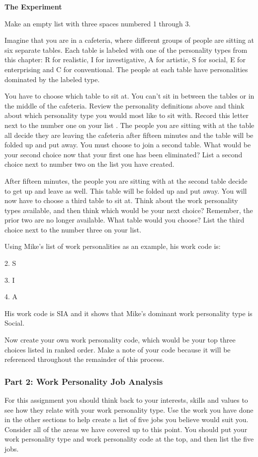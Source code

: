\textbf{The Experiment}

Make an empty list with three spaces numbered 1 through 3.

Imagine that you are in a cafeteria, where different groups of people are sitting at six separate tables. Each table is labeled with one of the personality types from this chapter: R for realistic, I for investigative, A for artistic, S for social, E for enterprising and C for conventional. The people at each table have personalities dominated by the labeled type.

You have to choose which table to sit at. You can't sit in between the tables or in the middle of the cafeteria. Review the personality definitions above and think about which personality type you would most like to sit with. Record this letter next to the number one on your list
.
The people you are sitting with at the table all decide they are leaving the cafeteria after fifteen minutes and the table will be folded up and put away. You must choose to join a second table. What would be your second choice now that your first one has been eliminated? List a second choice next to number two on the list you have created.

After fifteen minutes, the people you are sitting with at the second table decide to get up and leave as well. This table will be folded up and put away. You will now have to choose a third table to sit at. Think about the work personality types available, and then think which would be your next choice? Remember, the prior two are no longer available. What table would you choose? List the third choice next to the number three on your list.

Using Mike's list of work personalities as an example, his work code is:

2. S

3. I

4. A

His work code is SIA and it shows that Mike's dominant work personality type is Social.

Now create your own work personality code, which would be your top three choices listed in ranked order. Make a note of your code because it will be referenced throughout the remainder of this process.
\subsubsection*{Part 2: Work Personality Job Analysis}
For this assignment you should think back to your interests, skills and values to see how they relate with your work personality type. Use the work you have done in the other sections to help create a list of five jobs you believe would suit you. Consider all of the areas we have covered up to this point. You should put your work personality type and work personality code at the top, and then list the five jobs.

